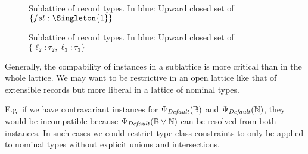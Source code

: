 \begin{figure}
  \centering
  \caption{Sublattice of record types. In {\color{blue}blue}: Upward closed set of $\{ fst : \Singleton{1} \}$}
  \label{fig:upset}
\end{figure}

\begin{figure}
  \centering
  \caption{Sublattice of record types. In {\color{blue}blue}: Upward closed set of $\{ \ell_2 : \tau_2, \ell_3 : \tau_3 \}$}
  \label{fig:upsets}
\end{figure}

Generally, the compability of instances in a sublattice is more critical than in the whole lattice.
We may want to be restrictive in an open lattice like that of extensible records but more liberal in a lattice of nominal types.

E.g. if we have contravariant instances for $\Psi_\mathit{Default}(\mathbb{B})$ and $\Psi_\mathit{Default}(\mathbb{N})$, they would be incompatible because $\Psi_\mathit{Default}(\mathbb{B} \vee \mathbb{N})$ can be resolved from both instances.
In such cases we could restrict type class constraints to only be applied to nominal types without explicit unions and intersections.